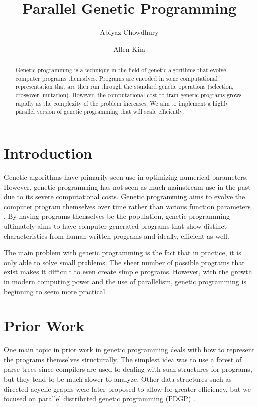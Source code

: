 \documentclass{article}
\begin{document}
	
	\title{Parallel Genetic Programming}
	
	\author{Abiyaz Chowdhury \and Allen Kim}
	
	\maketitle
	
	\begin{abstract}
Genetic programming is a technique in the field of genetic algorithms that evolve computer programs themselves. Programs are encoded in some computational representation that are then run through the standard genetic operations (selection, crossover, mutation). However, the computational cost to train genetic programs grows rapidly as the complexity of the problem increases. We aim to implement a highly parallel version of genetic programming that will scale efficiently.
	\end{abstract}
	
	\section{Introduction}
	Genetic algorithms have primarily seen use in optimizing numerical parameters. However, genetic programming has not seen as much mainstream use in the past due to its severe computational costs. Genetic programming aims to evolve the computer program themselves over time rather than various function parameters \cite{b1}. By having programs themselves be the population, genetic programming ultimately aims to have computer-generated programs that show distinct characteristics from human written programs and ideally, efficient as well.
	
	The main problem with genetic programming is the fact that in practice, it is only able to solve small problems. The sheer number of possible programs that exist makes it difficult to even create simple programs. However, with the growth in modern computing power and the use of parallelism, genetic programming is beginning to seem more practical.
	
	\section{Prior Work}
	
	One main topic in prior work in genetic programming deals with how to represent the programs themselves structurally. The simplest idea was to use a forest of parse trees since compilers are used to dealing with such structures for programs, but they tend to be much slower to analyze. Other data structures such as directed acyclic graphs \cite{b2} were later proposed to allow for greater efficiency, but we focused on parallel distributed genetic programming (PDGP) \cite{b3}. 
	
\end{document}
